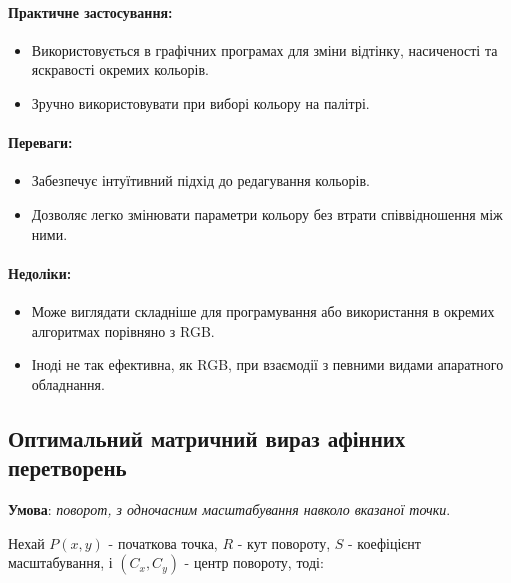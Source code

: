 \documentclass[oneside,14pt]{extarticle}
\begin{document}
\begin{normalsize}
	\paragraph{Практичне застосування:}
	\begin{itemize}
		\item Використовується в графічних програмах для зміни відтінку, насиченості та яскравості окремих кольорів.
		\item Зручно використовувати при виборі кольору на палітрі.
	\end{itemize}
	
	\paragraph{Переваги:}
	\begin{itemize}
		\item Забезпечує інтуїтивний підхід до редагування кольорів.
		\item Дозволяє легко змінювати параметри кольору без втрати співвідношення між ними.
	\end{itemize}
	
	\paragraph{Недоліки:}
	\begin{itemize}
		\item Може виглядати складніше для програмування або використання в окремих алгоритмах порівняно з RGB.
		\item Іноді не так ефективна, як RGB, при взаємодії з певними видами апаратного обладнання.
	\end{itemize}
	
	\subsection{Оптимальний матричний вираз афінних перетворень}
	\textbf{Умова}: \textit{поворот, з одночасним масштабування навколо вказаної точки}.
	
	Нехай $P (x, y)$ - початкова точка, $R$ - кут повороту, $S$ - коефіцієнт масштабування, і $(C_x, C_y)$ - центр повороту, тоді:
	

\end{normalsize}
\end{document}
